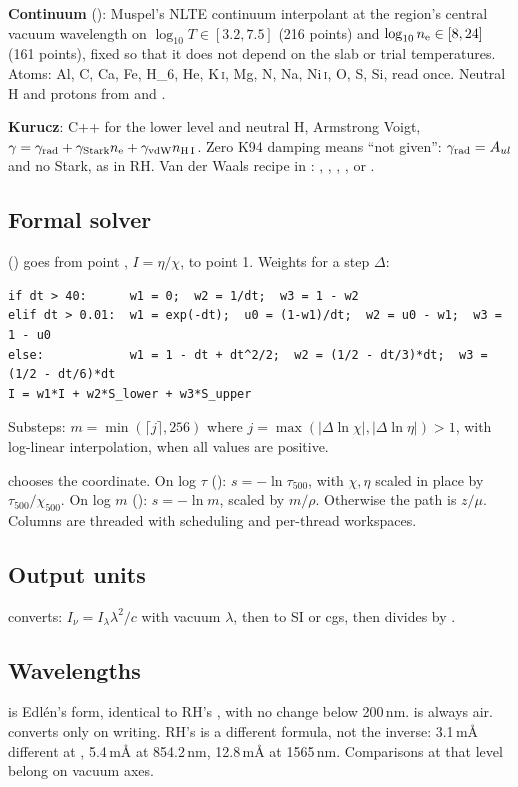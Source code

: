 \textbf{Continuum} (): Muspel's NLTE continuum interpolant at the region's central vacuum wavelength on $\log_{10}T\in[3.2,7.5]$ (216 points) and $\log_{10}n_{\rm e}\in[8,24]$ (161 points), fixed so that it does not depend on the slab or trial temperatures. Atoms: Al, C, Ca, Fe, H\_6, He, K\,\textsc{i}, Mg, N, Na, Ni\,\textsc{i}, O, S, Si, read once. Neutral H and protons from  and .

\textbf{Kurucz}: C++  for the lower level and neutral H, Armstrong Voigt, $\gamma=\gamma_{\rm rad}+\gamma_{\rm Stark}n_{\rm e}+\gamma_{\rm vdW}n_{\rm H\,I}$. Zero K94 damping means ``not given'': $\gamma_{\rm rad}=A_{ul}$ and no Stark, as in RH. Van der Waals recipe in : , , , , or .

\subsection{Formal solver}
 () goes from point , $I=\eta/\chi$, to point 1. Weights for a step $\Delta$:
\begin{lstlisting}
if dt > 40:      w1 = 0;  w2 = 1/dt;  w3 = 1 - w2
elif dt > 0.01:  w1 = exp(-dt);  u0 = (1-w1)/dt;  w2 = u0 - w1;  w3 = 1 - u0
else:            w1 = 1 - dt + dt^2/2;  w2 = (1/2 - dt/3)*dt;  w3 = (1/2 - dt/6)*dt
I = w1*I + w2*S_lower + w3*S_upper
\end{lstlisting}
Substeps: $m=\min(\lceil j\rceil,256)$ where $j=\max(|\Delta\ln\chi|,|\Delta\ln\eta|)>1$, with log-linear interpolation, when all values are positive.

 chooses the coordinate. On log $\tau$ (): $s=-\ln\tau_{500}$, with $\chi,\eta$ scaled in place by $\tau_{500}/\chi_{500}$. On log $m$ (): $s=-\ln m$, scaled by $m/\rho$. Otherwise the path is $z/\mu$. Columns are threaded with  scheduling and per-thread workspaces.

\subsection{Output units}
 converts: $I_\nu=I_\lambda\lambda^2/c$ with vacuum $\lambda$, then to SI or cgs, then divides by .

\subsection{Wavelengths}
 is Edl\'en's form, identical to RH's , with no change below 200\,nm.  is always air.  converts only on writing. RH's  is a different formula, not the inverse: 3.1\,m\AA{} different at \Halpha, 5.4\,m\AA{} at 854.2\,nm, 12.8\,m\AA{} at 1565\,nm. Comparisons at that level belong on vacuum axes.

